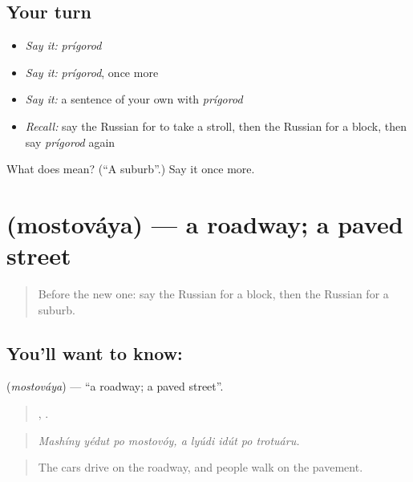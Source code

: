 \subsection*{Your turn}
\begin{itemize}
\raggedright
  \item \emph{Say it:} \emph{prígorod}
  \item \emph{Say it:} \emph{prígorod}, once more
  \item \emph{Say it:} a sentence of your own with \emph{prígorod}
  \item \emph{Recall:} say the Russian for to take a stroll, then the Russian for a block, then say \emph{prígorod} again
\end{itemize}

\begin{tcolorbox}[breakable,colback=teal!4,colframe=teal!35!black,title={Before you move on}]
What does  mean? (\textquotedblleft{}A suburb\textquotedblright{}.) Say it once more.
\end{tcolorbox}
\section[\texorpdfstring{\ru{мостовая} (mostováya)}{мостовая (mostováya)}]{ (mostováya) — a roadway; a paved street}

\label{lesson:RU-C443-mostovaya}



\begin{quote}
Before the new one: say the Russian for a block, then the Russian for a suburb.
\end{quote}

\subsection*{You'll want to know: }
\textbf{} (\emph{mostováya}) — \textquotedblleft{}a roadway; a paved street\textquotedblright{}.

\begin{quote}
   ,     .
\end{quote}

\begin{quote}
\emph{Mashíny yédut po mostovóy, a lyúdi idút po trotuáru.}
\end{quote}

\begin{quote}
The cars drive on the roadway, and people walk on the pavement.
\end{quote}

